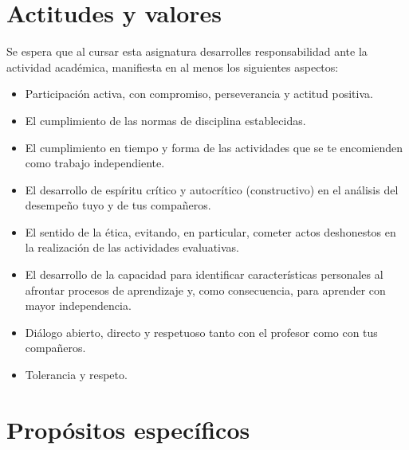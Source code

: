 \documentclass[11pt]{article}
\begin{document}
\section{Actitudes y valores}

Se espera que al cursar esta asignatura desarrolles responsabilidad ante la actividad académica, manifiesta en al menos los siguientes aspectos:

\begin{itemize}
	\renewcommand\labelitemi{\faCheckCircle}
	\item Participación activa, con compromiso, perseverancia y actitud positiva. 
	\item El cumplimiento de las normas de disciplina establecidas.
	\item El cumplimiento en tiempo y forma de las actividades que se te encomienden como trabajo independiente. 
	\item El desarrollo de espíritu crítico y autocrítico (constructivo) en el análisis del desempeño tuyo y de tus compañeros. 
	\item El sentido de la ética, evitando, en particular, cometer actos deshonestos en la realización de las actividades evaluativas.
	\item El desarrollo de la capacidad para identificar características personales al afrontar procesos de aprendizaje y, como consecuencia, para aprender con mayor independencia.
	\item Diálogo abierto, directo y respetuoso tanto con el profesor como con tus compañeros. 
	\item Tolerancia y respeto. 
\end{itemize}

\section{Propósitos específicos}
\end{document}
